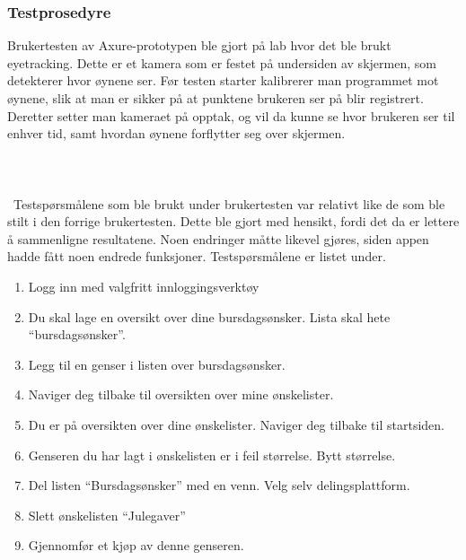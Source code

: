 \subsubsection{Testprosedyre}
Brukertesten av Axure-prototypen ble gjort på lab hvor det ble brukt eyetracking. Dette er et kamera som er festet på undersiden av skjermen, som detekterer hvor øynene ser. Før testen starter kalibrerer man programmet mot øynene, slik at man er sikker på at punktene brukeren ser på blir registrert. Deretter setter man kameraet på opptak, og vil da kunne se hvor brukeren ser til enhver tid, samt hvordan øynene forflytter seg over skjermen.
\\\\
\\\\\
Testspørsmålene som ble brukt under brukertesten var relativt like de som ble stilt i den forrige brukertesten. Dette ble gjort med hensikt, fordi det da er lettere å sammenligne resultatene. Noen endringer måtte likevel gjøres, siden appen hadde fått noen endrede funksjoner. Testspørsmålene er listet under.

\begin{enumerate}
    \item Logg inn med valgfritt innloggingsverktøy
    \item Du skal lage en oversikt over dine bursdagsønsker. Lista skal hete “bursdagsønsker”.
    \item Legg til en genser i listen over bursdagsønsker.
    \item Naviger deg tilbake til oversikten over mine ønskelister.
    \item Du er på oversikten over dine ønskelister. Naviger deg tilbake til startsiden.
    \item Genseren du har lagt i ønskelisten er i feil størrelse. Bytt størrelse.
    \item Del listen “Bursdagsønsker” med en venn. Velg selv delingsplattform.
    \item Slett ønskelisten “Julegaver”
    \item Gjennomfør et kjøp av denne genseren.
\end{enumerate}

